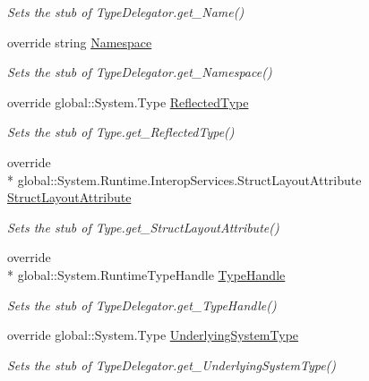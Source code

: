 \begin{DoxyCompactItemize}
\begin{DoxyCompactList}\small\item\em Sets the stub of Type\-Delegator.\-get\-\_\-\-Name()\end{DoxyCompactList}\item 
override string \hyperlink{class_system_1_1_reflection_1_1_fakes_1_1_stub_type_delegator_a73c07ac911faa5138c2b3a13abd5a1eb}{Namespace}
\begin{DoxyCompactList}\small\item\em Sets the stub of Type\-Delegator.\-get\-\_\-\-Namespace()\end{DoxyCompactList}\item 
override global\-::\-System.\-Type \hyperlink{class_system_1_1_reflection_1_1_fakes_1_1_stub_type_delegator_a51ad22304136530c7fab5985922850d9}{Reflected\-Type}
\begin{DoxyCompactList}\small\item\em Sets the stub of Type.\-get\-\_\-\-Reflected\-Type()\end{DoxyCompactList}\item 
override \\*
global\-::\-System.\-Runtime.\-Interop\-Services.\-Struct\-Layout\-Attribute \hyperlink{class_system_1_1_reflection_1_1_fakes_1_1_stub_type_delegator_a5ff11ef027c04d56090e6d666a6d205d}{Struct\-Layout\-Attribute}
\begin{DoxyCompactList}\small\item\em Sets the stub of Type.\-get\-\_\-\-Struct\-Layout\-Attribute()\end{DoxyCompactList}\item 
override \\*
global\-::\-System.\-Runtime\-Type\-Handle \hyperlink{class_system_1_1_reflection_1_1_fakes_1_1_stub_type_delegator_a4872b47df4bbba669495f26fbc457b0f}{Type\-Handle}
\begin{DoxyCompactList}\small\item\em Sets the stub of Type\-Delegator.\-get\-\_\-\-Type\-Handle()\end{DoxyCompactList}\item 
override global\-::\-System.\-Type \hyperlink{class_system_1_1_reflection_1_1_fakes_1_1_stub_type_delegator_a65d45ec428af32aa7495972a509bc7ea}{Underlying\-System\-Type}
\begin{DoxyCompactList}\small\item\em Sets the stub of Type\-Delegator.\-get\-\_\-\-Underlying\-System\-Type()\end{DoxyCompactList}\end{DoxyCompactItemize}


